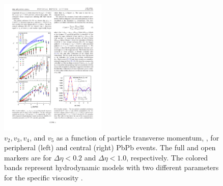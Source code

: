   \begin{figure}[htpb]
    \centering
    \includegraphics[width=0.45\textwidth]{Introduction/flow_measurements_central.pdf}
    \caption{$v_2, v_3, v_4$, and  $v_5$ as a function of particle transverse momentum, \pt, for peripheral (left) and central (right) PbPb events. The full and open markers are for  $\Delta\eta < 0.2$ and  $\Delta\eta < 1.0$, respectively. The colored bands represent hydrodynamic models with two different parameters for the specific viscosity \cite{Aamodt2011}.}
    \label{fig:flow_measurements}
  \end{figure}


